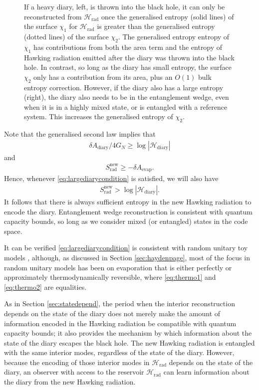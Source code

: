 \documentclass[12pt]{article}
\begin{document}
\begin{figure}[t]
\begin{subfigure}{.48\textwidth}
\end{subfigure}
\centering
\caption{If a heavy diary, left, is thrown into the black hole, it can only be reconstructed from $\mathcal{H}_\text{rad}$ once the generalised entropy (solid lines) of the surface $\chi_1$ for $\mathcal{H}_\text{rad}$ is greater than the generalised entropy (dotted lines) of the surface $\chi_2$. The generalised entropy entropy of $\chi_1$ has contributions from both the area term and the entropy of Hawking radiation emitted after the diary was thrown into the black hole. In contrast, so long as the diary has small entropy, the surface $\chi_2$ only has a contribution from its area, plus an $O(1)$ bulk entropy correction. However, if the diary also has a large entropy (right), the diary also needs to be in the entanglement wedge, even when it is in a highly mixed state, or is entangled with a reference system. This increases the generalised entropy of $\chi_2$.}
\label{fig:largediaryevap}
\end{figure}

Note that the generalised second law implies that 
\begin{align} \label{eq:thermo1}
\delta A_\text{diary}/ 4G_N \geq \log |\mathcal{H}_\text{diary}|
\end{align}
 and 
\begin{align} \label{eq:thermo2}
 S_\text{rad}^\text{new} \geq -\delta A_\text{evap}.
 \end{align}
Hence, whenever  \eqref{eq:largediarycondition} is satisfied, we will also have
\begin{align}
S_\text{rad}^\text{new} > \log |\mathcal{H}_\text{diary}|.
\end{align}
It follows that there is always sufficient entropy in the new Hawking radiation to encode the diary. Entanglement wedge reconstruction is consistent with quantum capacity bounds, so long as we consider mixed (or entangled) states in the code space.

It can be verified \eqref{eq:largediarycondition} is consistent with random unitary toy models \cite{hayden2018learning}, although, as discussed in Section \ref{sec:haydenpage}, most of the focus in random unitary models has been on evaporation that is either perfectly or approximately thermodynamically reversible, where \eqref{eq:thermo1} and \eqref{eq:thermo2} are equalities.

As in Section \ref{sec:statedepend}, the period when the interior reconstruction depends on the state of the diary does not merely make the amount of information encoded in the Hawking radiation be compatible with quantum capacity bounds; it also provides the mechanism by which information about the state of the diary escapes the black hole. The new Hawking radiation is entangled with the same interior modes, regardless of the state of the diary. However, because the encoding of those interior modes in $\mathcal{H}_\text{rad}$ depends on the state of the diary, an observer with access to the reservoir $\mathcal{H}_\text{rad}$ can learn information about the diary from the new Hawking radiation.
\end{document}
